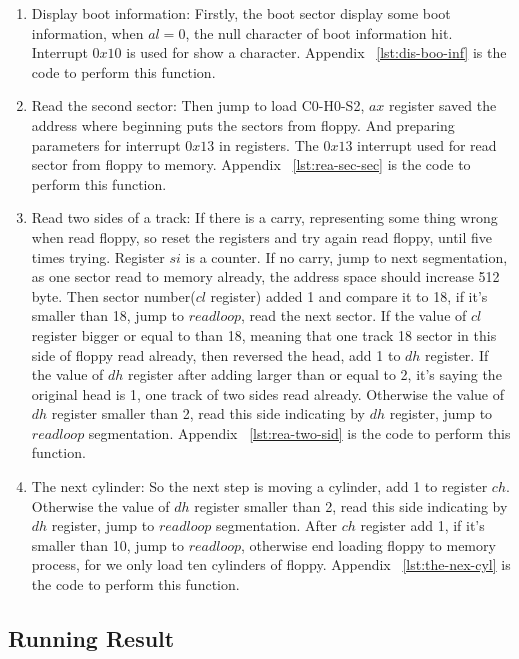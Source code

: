 \documentclass{swfcthesisp}
\begin{document}
\begin{enumerate}
\item Display boot information:
Firstly, the boot sector display some boot information, when $al=0$, the null character of
boot information hit. Interrupt $0x10$ is used for show a character. Appendix
~\ref{lst:dis-boo-inf} is the code to perform this function.

\item Read the second sector:
  Then jump to load C0-H0-S2, $ax$ register saved the
address where beginning puts the sectors from floppy. And preparing parameters for
interrupt $0x13$ in registers. The $0x13$ interrupt used for read sector from floppy to
memory. Appendix ~\ref{lst:rea-sec-sec} is the code to perform this function.

\item Read two sides of a track:
  If there is a carry, representing some thing wrong when read floppy, so reset the
registers and try again read floppy, until five times trying. Register $si$ is a counter. If
no carry, jump to next segmentation, as one sector read to memory already, the address
space should increase 512 byte. Then sector number($cl$ register) added 1 and compare it to 18, if it's
smaller than 18, jump to $readloop$, read the next sector. If the value of $cl$ register
bigger or equal to than 18, meaning that one track 18 sector in this side of floppy read already, then
reversed the head, add 1 to $dh$ register. If the value of $dh$ register after adding
larger than or equal to 2, it's saying the original head is 1, one track of two sides read
already. Otherwise the value of $dh$ register smaller than 2, read this side indicating by
$dh$ register, jump to $readloop$ segmentation. Appendix ~\ref{lst:rea-two-sid} is the
code to perform this function.


\item The next cylinder:
So the next step is moving a cylinder, add 1 to register $ch$. Otherwise the
value of $dh$ register smaller than 2, read this side indicating by $dh$ register, jump to
$readloop$ segmentation. After $ch$ register add 1, if it's smaller than 10, jump to
$readloop$, otherwise end loading floppy to memory process, for we only load ten cylinders
of floppy. Appendix ~\ref{lst:the-nex-cyl} is the code to perform this function.

  
\end{enumerate}


\subsection{Running Result}
\label{sec:running-result}
\end{document}
